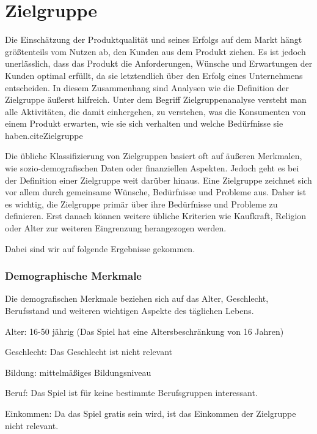 
\section{Zielgruppe}\label{sec:zielgruppe}

\renewcommand{\kapitelautor}{Autor: Nils Hubmann}

%
Die Einschätzung der Produktqualität und seines Erfolgs auf dem Markt hängt größtenteils vom Nutzen ab, den Kunden aus dem Produkt ziehen.
Es ist jedoch unerlässlich, dass das Produkt die Anforderungen, Wünsche und Erwartungen der Kunden optimal erfüllt, da sie letztendlich über den Erfolg eines Unternehmens entscheiden.
In diesem Zusammenhang sind Analysen wie die Definition der Zielgruppe äußerst hilfreich.
Unter dem Begriff Zielgruppenanalyse versteht man alle Aktivitäten, die damit einhergehen, zu verstehen, was die Konsumenten von einem Produkt erwarten, wie sie sich verhalten und welche Bedürfnisse sie haben.cite{Zielgruppe}


Die übliche Klassifizierung von Zielgruppen basiert oft auf äußeren Merkmalen, wie sozio-demografischen Daten oder finanziellen Aspekten.
Jedoch geht es bei der Definition einer Zielgruppe weit darüber hinaus.
Eine Zielgruppe zeichnet sich vor allem durch gemeinsame Wünsche, Bedürfnisse und Probleme aus.
Daher ist es wichtig, die Zielgruppe primär über ihre Bedürfnisse und Probleme zu definieren.
Erst danach können weitere übliche Kriterien wie Kaufkraft, Religion oder Alter zur weiteren Eingrenzung herangezogen werden. 

Dabei sind wir auf folgende Ergebnisse gekommen.

\subsubsection{Demographische Merkmale}\label{subsubsec:Demographische-Merkmale}

Die demografischen Merkmale beziehen sich auf das Alter, Geschlecht, Berufsstand und weiteren wichtigen Aspekte des täglichen Lebens.

\begin{liste}
    \item Alter: 16-50 jährig (Das Spiel hat eine Altersbeschränkung von 16 Jahren)
    \item Geschlecht: Das Geschlecht ist nicht relevant
    \item Bildung: mittelmäßiges Bildungsniveau
    \item Beruf: Das Spiel ist für keine bestimmte Berufsgruppen interessant.
    \item Einkommen: Da das Spiel gratis sein wird, ist das Einkommen der Zielgruppe nicht relevant.
\end{liste}


